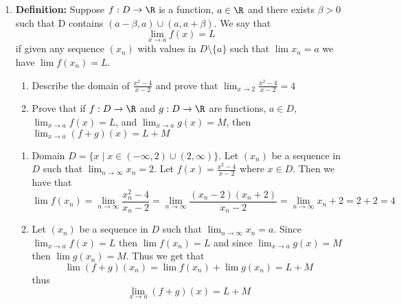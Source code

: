 \documentclass[11pt]{exam}
\begin{document}
\begin{enumerate}
        \item \textbf{Definition: } Suppose $f: D \to \R$ is a function, $a \in \R$ and there exists $\beta > 0$ such that D contains $(a - \beta, a) \cup (a, a + \beta)$. We say that 
        $$\lim_{x \to a} f(x) = L$$
        if given any sequence $(x_n)$ with values in $D \setminus \{a\}$ such that $\lim x_n = a$ we have $\lim f(x_n) = L$.
            \begin{enumerate}
                \item Describe the domain of $\frac{x^2-4}{x-2}$ and prove that $\lim_{x \to 2} \frac{x^2-4}{x-2} = 4$
                \item Prove that if $f: D \to \R$ and 
                $g: D \to \R$ are functions, $a \in D$,
                $\lim_{x \to a} f(x) = L$, and $\lim_{x \to a} g(x) = M$, then $\lim_{x \to a} (f+g)(x) = L + M$
            \end{enumerate}
                \begin{solution}
                    \begin{enumerate}
                        \item Domain $D = \{x \mid x \in (-\infty, 2) \cup (2, \infty)\}$. Let $(x_n)$ be a sequence in $D$ such that $\lim_{n \to \infty} x_n = 2$. Let $f(x) = \frac{x^2 - 4}{x - 2}$ where $x \in D$. Then we have that 
                        $$\lim f(x_n) = \lim_{n \to \infty} \frac{x_n^2 - 4}{x_n-2} = \lim_{n \to \infty} \frac{(x_n - 2) (x_n+2)}{x_n-2} = 
                        \lim_{n \to \infty} x_n + 2 = 2 + 2 = 4
                        $$
                        \item Let $(x_n)$ be a sequence in $D$ such that $\lim_{n \to \infty} x_n = a$. Since $\lim_{x \to a} f(x) = L$ then 
                        $\lim f(x_n) = L$ and since $\lim_{x \to a} g(x) = M$ then $\lim g(x_n) = M$. Thus we get that 
                        $$\lim (f+g)(x_n) = \lim f(x_n) + \lim g(x_n) = L + M$$ thus 
                        $$\lim_{x \to a} (f+g)(x) = L + M$$
                    \end{enumerate}
                \end{solution}
    \end{enumerate}
\end{document}
